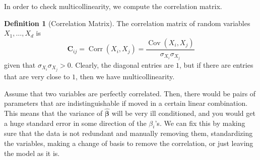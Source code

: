 \documentclass{article}
\DeclareMathOperator{\Cov}{Cov}
\DeclareMathOperator{\Corr}{Corr}
\theoremstyle{definition}
\theoremstyle{remark}
\theoremstyle{definition}
\newtheorem{definition}{Definition}[section]
\begin{document}
In order to check multicollinearity, we compute the correlation matrix. 

\begin{definition}[Correlation Matrix]
The correlation matrix of random variables $X_1, \ldots, X_d$ is 
\[\mathbf{C}_{ij} = \Corr(X_i, X_j) = \frac{\Cov(X_i, X_j)}{\sigma_{X_i} \sigma_{X_j}}\]
given that $\sigma_{X_i} \sigma_{X_j} > 0$. Clearly, the diagonal entries are $1$, but if there are entries that are very close to $1$, then we have multicollinearity. 
\end{definition}

Assume that two variables are perfectly correlated. Then, there would be pairs of parameters that are indistinguishable if moved in a certain linear combination. This means that the variance of $\hat{\boldsymbol{\beta}}$ will be very ill conditioned, and you would get a huge standard error in some direction of the $\beta_i$'s. We can fix this by making sure that the data is not redundant and manually removing them, standardizing the variables, making a change of basis to remove the correlation, or just leaving the model as it is. 
\end{document}
